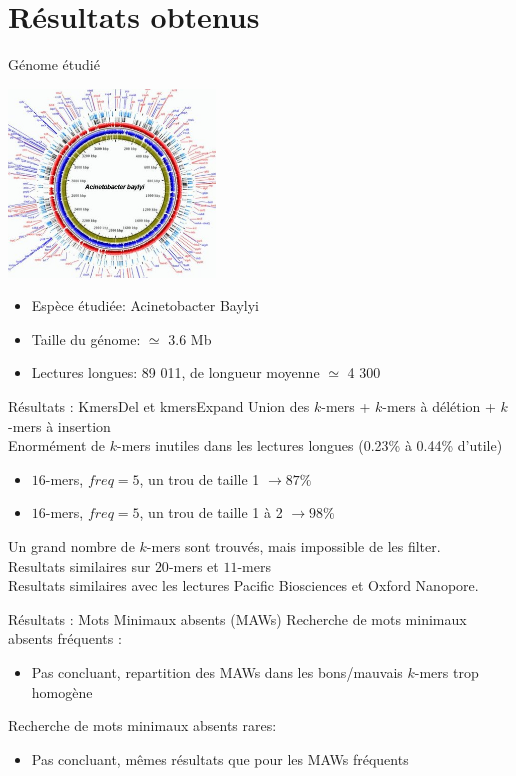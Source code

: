 \documentclass[11pt]{beamer}
\begin{document}
\section{Résultats obtenus}
\begin{frame}[fragile]{Génome étudié}
  \begin{center}
    \includegraphics[height=50mm]{acineto}
  \end{center}
  \begin{itemize}[<+-| alert@+>]
    \item Espèce étudiée: Acinetobacter Baylyi
    \item Taille du génome: $\simeq$ 3.6 Mb
    \item Lectures longues: 89 011, de longueur moyenne $\simeq$ 4 300
  \end{itemize}
\end{frame}
\begin{frame}[fragile]{Résultats : KmersDel et kmersExpand}
  Union des $\textit{k}$-mers + $\textit{k}$-mers à délétion + $\textit{k}$-mers à insertion\medskip\\\pause
  Enormément de $k$-mers inutiles dans les lectures longues (0.23\% à 0.44\% d'utile)\pause
  \begin{itemize}[<+-| alert@+>]
    \item $16$-mers, $freq = 5$, un trou de taille 1 $\rightarrow 87\%$
    \item $16$-mers, $freq = 5$, un trou de taille 1 à 2 $\rightarrow 98\%$
  \end{itemize}
  \pause
  Un grand nombre de $\textit{k}$-mers sont trouvés, mais impossible de les filter.\medskip\pause\\
  Resultats similaires sur $20$-mers et $11$-mers\medskip\pause\\
  Resultats similaires avec les lectures Pacific Biosciences et Oxford Nanopore.
\end{frame}

\begin{frame}[fragile]{Résultats : Mots Minimaux absents (MAWs)}
  Recherche de mots minimaux absents fréquents :\pause
  \begin{itemize}
    \item Pas concluant, repartition des MAWs dans les bons/mauvais $k$-mers trop homogène
  \end{itemize}\pause
  Recherche de mots minimaux absents rares:\pause
  \begin{itemize}
    \item Pas concluant, mêmes résultats que pour les MAWs fréquents
  \end{itemize}
\end{frame}
\end{document}
